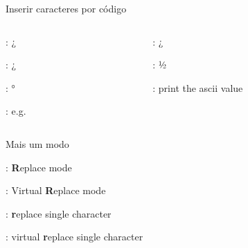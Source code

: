 \begin{frame}{Inserir caracteres por código}
    \begin{columns}
        \begin{column}{0.6\textwidth}
            \begin{widedescription}
                \item {}: ¿
                \item {}: ¿
                \item {}: °
                \item {}: e.g. 
            \end{widedescription}
        \end{column}
        
        \begin{column}{0.42\textwidth}
            \begin{widedescription}
                \item {}
                \item {}: ¿
                \item {}: ½
                \item {}: print the ascii value
            \end{widedescription}
        \end{column}
    \end{columns}
\end{frame}

\begin{frame}{Mais um modo}
    \begin{widedescription}
        \item {}: \textbf{R}eplace mode
        \item {}: Virtual \textbf{R}eplace mode
        \item {}: \textbf{r}eplace single character
        \item {}: virtual \textbf{r}eplace single character
    \end{widedescription}
\end{frame}
